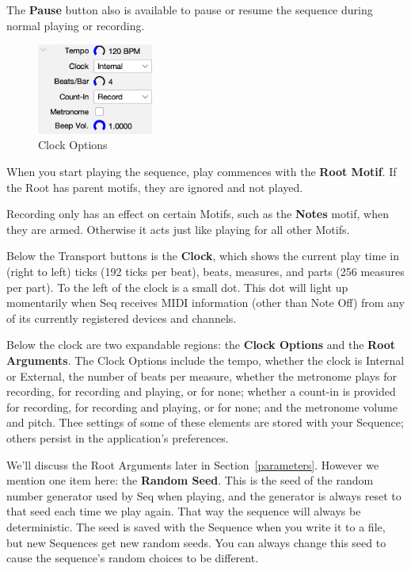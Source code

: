 \documentclass[twoside,10pt]{article}
\begin{document}
The {\bf Pause} button also is available to pause or resume the sequence during normal playing or recording.

\begin{figure}
\includegraphics[width=1.5in]{clock}
\caption{Clock Options}
\label{clockoptions}
\end{figure}

When you start playing the sequence, play commences with the {\bf Root Motif}.  If the Root has parent motifs, they are ignored and not played.  

Recording only has an effect on certain Motifs, such as the {\bf Notes} motif, when they are armed.  Otherwise it acts just like playing for all other Motifs.

Below the Transport buttons is the {\bf Clock}, which shows the current play time in (right to left) ticks (192 ticks per beat), beats, measures, and parts (256 measures per part).  To the left of the clock is a small dot.  This dot will light up momentarily when Seq receives MIDI information (other than Note Off) from any of its currently registered devices and channels.

Below the clock are two expandable regions: the {\bf Clock Options} and the {\bf Root Arguments}.  The Clock Options include the tempo, whether the clock is Internal or External, the number of beats per measure, whether the metronome plays for recording,  for recording and playing, or for none; whether a count-in is provided for recording, for recording and playing, or for none; and the metronome volume and pitch.  Thee settings of some of these elements are stored with your Sequence; others persist in the application's preferences.

We'll discuss the Root Arguments later in Section~\ref{parameters}.  However we mention one item here: the {\bf Random Seed}.  This is the seed of the random number generator used by Seq when playing, and the generator is always reset to that seed each time we play again.  That way the sequence will always be deterministic.  The seed is saved with the Sequence when you write it to a file, but new Sequences get new random seeds. You can always change this seed to cause the sequence's random choices to be different.
\end{document}
